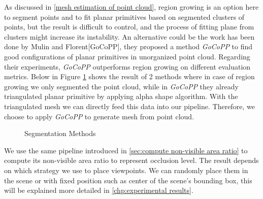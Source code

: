 \documentclass[11pt, a4paper,oneside,chapterprefix=false]{scrbook}
\begin{document}
As discussed in \ref{mesh estimation of point cloud}, region growing is an option here to segment points and to fit planar primitives based on segmented clusters of points, but the result is difficult to control, and the process of fitting plane from clusters might increase its instability. An alternative could be the work has been done by Mulin and Florent[GoCoPP], they proposed a method \textit{GoCoPP} to find good configurations of planar primitives in unorganized point cloud. Regarding their experiments, \textit{GoCoPP} outperforms region growing on different evaluation metrics. Below in Figure \ref{segmentation results} shows the result of 2 methods where in case of region growing we only segmented the point cloud, while in \textit{GoCoPP} they already triangulated planar primitive by applying alpha shape algorithm. With the triangulated mesh we can directly feed this data into our pipeline. Therefore, we choose to apply \textit{GoCoPP} to generate mesh from point cloud.

\begin{figure}[H]
    \centering
      \label{fig:region growing} 
     \label{fig:gocopp}
    \caption{Segmentation Methods}
    \label{segmentation results}
\end{figure}

We use the same pipeline introduced in \ref{sec:compute non-visible area ratio} to compute its non-visible area ratio to represent occlusion level. The result depends on which strategy we use to place viewpoints. We can randomly place them in the scene or with fixed position such as center of the scene's bounding box, this will be explained more detailed in \ref{chp:experimental results}.
\end{document}
